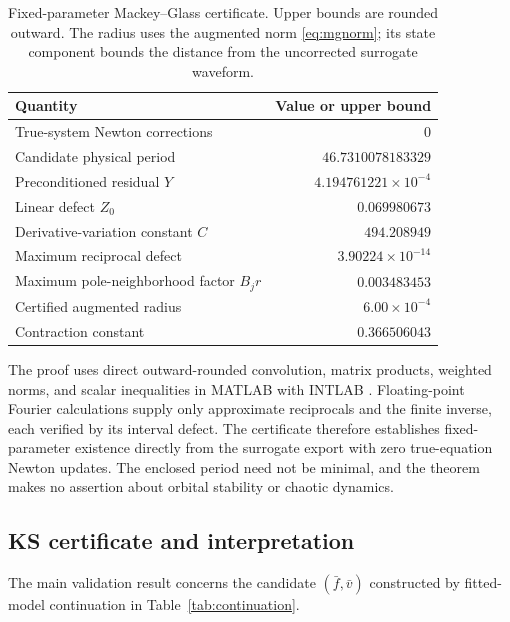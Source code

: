 \documentclass[11pt]{article}
\begin{document}
\begin{table}[htb]
\centering
\caption{Fixed-parameter Mackey--Glass certificate. Upper bounds are rounded outward. The radius uses the augmented norm \eqref{eq:mgnorm}; its state component bounds the distance from the uncorrected surrogate waveform.}
\label{tab:mgcap}
\begin{tabular}{lr}
\toprule
Quantity & Value or upper bound\\
\midrule
True-system Newton corrections &0\\
Candidate physical period &$46.7310078183329$\\
Preconditioned residual $Y$ &$4.194761221\times10^{-4}$\\
Linear defect $Z_0$ &$0.069980673$\\
Derivative-variation constant $C$ &$494.208949$\\
Maximum reciprocal defect &$3.90224\times10^{-14}$\\
Maximum pole-neighborhood factor $B_jr$ &$0.003483453$\\
Certified augmented radius &$6.00\times10^{-4}$\\
Contraction constant &$0.366506043$\\
\bottomrule
\end{tabular}
\end{table}

The proof uses direct outward-rounded convolution, matrix products, weighted norms, and scalar inequalities in MATLAB with INTLAB \cite{rump1999}. Floating-point Fourier calculations supply only approximate reciprocals and the finite inverse, each verified by its interval defect. The certificate therefore establishes fixed-parameter existence directly from the surrogate export with zero true-equation Newton updates. The enclosed period need not be minimal, and the theorem makes no assertion about orbital stability or chaotic dynamics.


\subsection{KS certificate and interpretation}
The main validation result concerns the candidate $(\bar f,\bar v)$ constructed by fitted-model continuation in Table~\ref{tab:continuation}.
\end{document}
